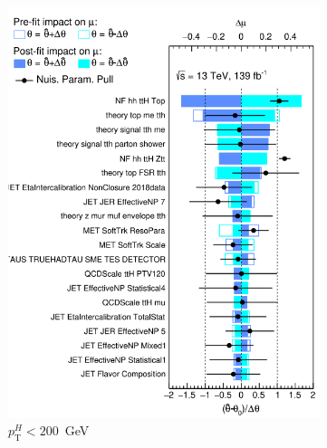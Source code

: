 \begin{figure}[htbp]
  \centering

  \begin{subfigure}[b]{0.45\textwidth}
    \centering
    \includegraphics[width=\linewidth]{images/fit_stxs/Ranking_r_9_ttH_ptH_0_200.png}
    \caption{\small $p_{\text{T}}^{H}<200$~GeV}
    \label{fig:ranking_tth_ptH_0_200}
  \end{subfigure}\hfill
  \begin{subfigure}[b]{0.45\textwidth}
    \centering

\end{subfigure}
\end{figure}
